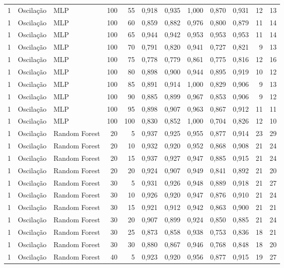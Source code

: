 \begin{longtable}{@{}rllrrrrrrrrr@{}}
1 & Oscilação & MLP & 100 & 55 & 0,918 & 0,935 & 1,000 & 0,870 & 0,931 & 12 & 13 \\
1 & Oscilação & MLP & 100 & 60 & 0,859 & 0,882 & 0,976 & 0,800 & 0,879 & 11 & 14 \\
1 & Oscilação & MLP & 100 & 65 & 0,944 & 0,942 & 0,953 & 0,953 & 0,953 & 11 & 14 \\
1 & Oscilação & MLP & 100 & 70 & 0,791 & 0,820 & 0,941 & 0,727 & 0,821 & 9 & 13 \\
1 & Oscilação & MLP & 100 & 75 & 0,778 & 0,779 & 0,861 & 0,775 & 0,816 & 12 & 16 \\
1 & Oscilação & MLP & 100 & 80 & 0,898 & 0,900 & 0,944 & 0,895 & 0,919 & 10 & 12 \\
1 & Oscilação & MLP & 100 & 85 & 0,891 & 0,914 & 1,000 & 0,829 & 0,906 & 9 & 13 \\
1 & Oscilação & MLP & 100 & 90 & 0,885 & 0,899 & 0,967 & 0,853 & 0,906 & 9 & 12 \\
1 & Oscilação & MLP & 100 & 95 & 0,898 & 0,907 & 0,963 & 0,867 & 0,912 & 11 & 11 \\
1 & Oscilação & MLP & 100 & 100 & 0,830 & 0,852 & 1,000 & 0,704 & 0,826 & 12 & 10 \\
1 & Oscilação & Random Forest & 20 & 5 & 0,937 & 0,925 & 0,955 & 0,877 & 0,914 & 23 & 29 \\
1 & Oscilação & Random Forest & 20 & 10 & 0,932 & 0,920 & 0,952 & 0,868 & 0,908 & 21 & 24 \\
1 & Oscilação & Random Forest & 20 & 15 & 0,937 & 0,927 & 0,947 & 0,885 & 0,915 & 21 & 24 \\
1 & Oscilação & Random Forest & 20 & 20 & 0,924 & 0,907 & 0,949 & 0,841 & 0,892 & 21 & 20 \\
1 & Oscilação & Random Forest & 30 & 5 & 0,931 & 0,926 & 0,948 & 0,889 & 0,918 & 21 & 27 \\
1 & Oscilação & Random Forest & 30 & 10 & 0,926 & 0,920 & 0,947 & 0,876 & 0,910 & 21 & 24 \\
1 & Oscilação & Random Forest & 30 & 15 & 0,921 & 0,912 & 0,942 & 0,863 & 0,900 & 21 & 21 \\
1 & Oscilação & Random Forest & 30 & 20 & 0,907 & 0,899 & 0,924 & 0,850 & 0,885 & 21 & 24 \\
1 & Oscilação & Random Forest & 30 & 25 & 0,873 & 0,858 & 0,938 & 0,753 & 0,836 & 18 & 21 \\
1 & Oscilação & Random Forest & 30 & 30 & 0,880 & 0,867 & 0,946 & 0,768 & 0,848 & 18 & 20 \\
1 & Oscilação & Random Forest & 40 & 5 & 0,923 & 0,920 & 0,956 & 0,877 & 0,915 & 19 & 27 \\

\end{longtable}
